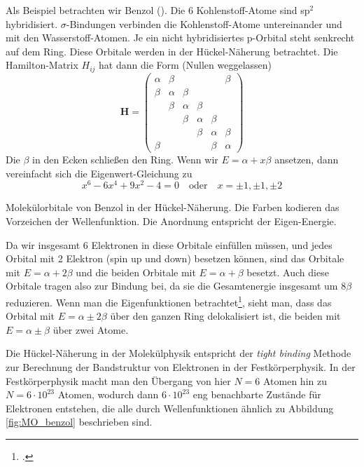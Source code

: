Als Beispiel betrachten wir Benzol (). Die 6 Kohlenstoff-Atome sind sp$^2$ hybridisiert. $\sigma$-Bindungen verbinden die Kohlenstoff-Atome untereinander und mit den Wasserstoff-Atomen. Je ein nicht hybridisiertes p-Orbital steht senkrecht auf dem Ring. Diese Orbitale werden in der Hückel-Näherung betrachtet. Die Hamilton-Matrix $H_{ij}$ hat dann die Form (Nullen weggelassen)
\begin{equation}
\mathbf{H} = 
 \begin{pmatrix}
  \alpha  & \beta &  &  &  & \beta \\
  \beta & \alpha  & \beta & & & \\
  & \beta & \alpha  & \beta & & \\
 &  & \beta & \alpha & \beta & \\
&  &  & \beta & \alpha & \beta \\
\beta & &  &  & \beta & \alpha 
 \end{pmatrix} 
\end{equation}
Die $\beta$ in den Ecken schließen den Ring.
Wenn wir $E = \alpha + x \beta$ ansetzen, dann vereinfacht sich die Eigenwert-Gleichung zu 
\begin{equation}
x^6 - 6 x^4 + 9x^2 - 4 = 0 \quad \text{oder} \quad x = \pm 1, \pm 1, \pm 2
\end{equation}
%
\begin{marginfigure}[150mm]
\caption{Molekülorbitale von Benzol in der Hückel-Näherung. Die Farben kodieren das Vorzeichen der Wellenfunktion. Die Anordnung entspricht der Eigen-Energie.\label{fig:MO_benzol}}
\end{marginfigure}
%
Da wir insgesamt 6 Elektronen in diese Orbitale einfüllen müssen, und jedes Orbital mit 2 Elektron (spin up und down) besetzen können, sind das Orbitale mit $E=\alpha + 2 \beta$ und die beiden Orbitale mit $E = \alpha + \beta$ besetzt. Auch diese Orbitale tragen also zur Bindung bei, da sie die Gesamtenergie insgesamt um $8\beta$ reduzieren. Wenn man die Eigenfunktionen betrachtet\footcite{Atkins}, sieht man, dass  das Orbital mit $E=\alpha \pm 2 \beta$  über den ganzen Ring delokalisiert ist, die beiden mit $E = \alpha \pm \beta$  über zwei  Atome.

Die Hückel-Näherung in der Molekülphysik entspricht der \emph{tight binding} Methode zur Berechnung der Bandstruktur von Elektronen  in der Festkörperphysik. In der Festkörperphysik macht man den Übergang von hier $N=6$ Atomen hin zu $N= 6 \cdot 10^{23}$ Atomen, wodurch dann  $6 \cdot 10^{23}$ eng benachbarte Zustände für Elektronen entstehen, die alle durch Wellenfunktionen ähnlich zu Abbildung \ref{fig:MO_benzol} beschrieben sind.


\printbibliography[segment=\therefsegment,heading=subbibliography]
